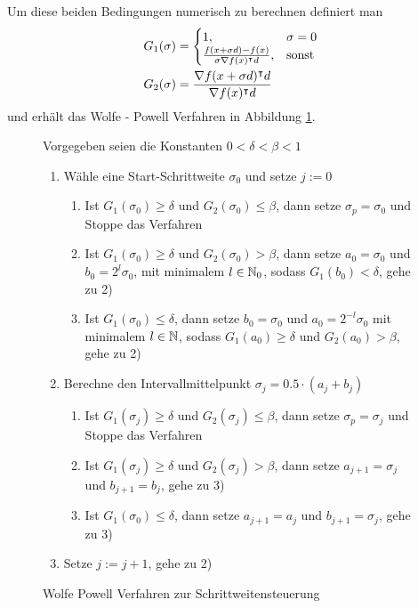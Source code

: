 Um diese beiden Bedingungen numerisch zu berechnen definiert man
\begin{equation}
\begin{aligned}
 G_1(\sigma)&=
 \begin{cases}
 1,& \sigma=0\\
 \frac{f(x+\sigma d)-f(x)}{\sigma \nabla f(x)^\intercal d}, & \text{sonst}
 \end{cases} \\
 G_2(\sigma) &= \frac{\nabla f(x+\sigma d)^\intercal d}{\nabla f(x)^\intercal d}
 \end{aligned}
\end{equation}
und erhält das Wolfe - Powell Verfahren in Abbildung \ref{alg:wolfePowell}.

\begin{figure}
\begin{framed}
Vorgegeben seien die Konstanten $0<\delta<\beta<1$
 \begin{enumerate}
  \item Wähle eine Start-Schrittweite $\sigma_0$ und setze $j:=0$
  \begin{enumerate}
   \item Ist $G_1(\sigma_0)\geq \delta$ und $G_2(\sigma_0)\leq \beta$, dann setze $\sigma_p=\sigma_0$ und Stoppe das Verfahren
   \item Ist $G_1(\sigma_0)\geq \delta$ und $G_2(\sigma_0)> \beta$, dann setze $a_0=\sigma_0$ und $b_0=2^l\sigma_0$, mit minimalem $l\in \mathbb{N}_0$, sodass $G_1(b_0)<\delta$, gehe zu 2)
   \item Ist $G_1(\sigma_0)\leq \delta$, dann setze $b_0=\sigma_0$ und $a_0=2^{-l}\sigma_0$ mit minimalem $l\in \mathbb{N}$, sodass $G_1(a_0)\geq\delta$ und $G_2(a_0)>\beta$, gehe zu 2)
  \end{enumerate}
  \item Berechne den Intervallmittelpunkt $\sigma_j = 0.5\cdot (a_j+b_j)$
  \begin{enumerate}
    \item Ist $G_1(\sigma_j)\geq \delta$ und $G_2(\sigma_j)\leq \beta$, dann setze $\sigma_p=\sigma_j$ und Stoppe das Verfahren
    \item Ist $G_1(\sigma_j)\geq \delta$ und $G_2(\sigma_j)> \beta$, dann setze $a_{j+1}=\sigma_j$ und $b_{j+1}=b_j$, gehe zu 3)
    \item Ist $G_1(\sigma_0)\leq \delta$, dann setze $a_{j+1}=a_j$ und $b_{j+1}=\sigma_j$, gehe zu 3)
  \end{enumerate}
  \item Setze $j:=j+1$, gehe zu 2)
 \end{enumerate}
\end{framed}
\caption{Wolfe Powell Verfahren zur Schrittweitensteuerung}
\label{alg:wolfePowell}
\end{figure}


